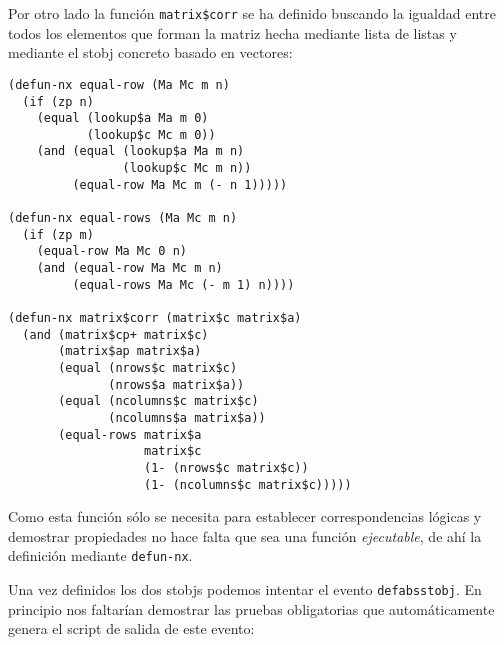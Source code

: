 \documentclass[a4paper,10pt]{article}
\begin{document}
\par \vspace{10pt}
Por otro lado la función \texttt{matrix\$corr} se ha definido buscando la igualdad entre todos los elementos que forman la matriz hecha mediante lista de listas y mediante el stobj concreto basado en vectores:

\par \vspace{10pt}

\begin{lstlisting}[language=clips]
(defun-nx equal-row (Ma Mc m n)
  (if (zp n)
    (equal (lookup$a Ma m 0)
           (lookup$c Mc m 0))
    (and (equal (lookup$a Ma m n)
                (lookup$c Mc m n))
         (equal-row Ma Mc m (- n 1)))))

(defun-nx equal-rows (Ma Mc m n)
  (if (zp m)
    (equal-row Ma Mc 0 n)
    (and (equal-row Ma Mc m n)
         (equal-rows Ma Mc (- m 1) n))))

(defun-nx matrix$corr (matrix$c matrix$a)
  (and (matrix$cp+ matrix$c)
       (matrix$ap matrix$a) 
       (equal (nrows$c matrix$c) 
              (nrows$a matrix$a))
       (equal (ncolumns$c matrix$c) 
              (ncolumns$a matrix$a))
       (equal-rows matrix$a 
                   matrix$c 
                   (1- (nrows$c matrix$c)) 
                   (1- (ncolumns$c matrix$c)))))
\end{lstlisting}

\par \vspace{10pt}

Como esta función sólo se necesita para establecer correspondencias lógicas y demostrar propiedades no hace falta que sea una función \emph{ejecutable}, de ahí la definición mediante \texttt{defun-nx}.

\par \vspace{10pt}

Una vez definidos los dos stobjs podemos intentar el evento \texttt{defabsstobj}. En principio nos faltarían demostrar las pruebas obligatorias que automáticamente genera el script de salida de este evento:

\par \vspace{10pt}
\end{document}
